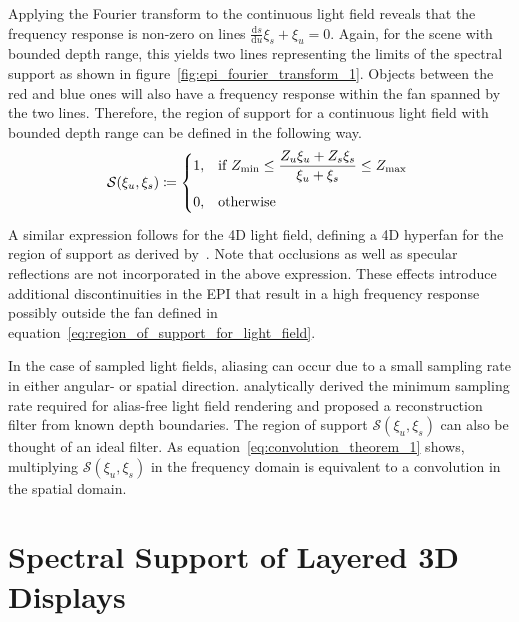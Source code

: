 Applying the Fourier transform to the continuous light field reveals that the frequency response is non-zero on lines $\frac{\textrm{d}s}{\textrm{d}u} \xi_s + \xi_u = 0$. 
Again, for the scene with bounded depth range, this yields two lines representing the limits of the spectral support as shown in figure~\ref{fig:epi_fourier_transform_1}.
Objects between the red and blue ones will also have a frequency response within the fan spanned by the two lines.
Therefore, the region of support for a continuous light field with bounded depth range can be defined in the following way.
\begin{equation}\label{eq:region_of_support_for_light_field}
	\mathcal{S}(\xi_u, \xi_s) \coloneqq 
	    \begin{dcases*}
		    1, 			& if $Z_\text{min} \leq \dfrac{Z_u \xi_u + Z_s \xi_s}{\xi_u + \xi_s} \leq Z_\text{max}$ \\
		    0,			& otherwise $\vphantom{\dfrac{0}{0}}$ 
	    \end{dcases*}
\end{equation}
A similar expression follows for the 4D light field, defining a 4D hyperfan for the region of support as derived by~\cite{LinearVolumetricFocus}.
Note that occlusions as well as specular reflections are not incorporated in the above expression.
These effects introduce additional discontinuities in the EPI that result in a high frequency response possibly outside the fan defined in equation~\ref{eq:region_of_support_for_light_field}.

In the case of sampled light fields, aliasing can occur due to a small sampling rate in either angular- or spatial direction.
\cite{PlenopticSampling} analytically derived the minimum sampling rate required for alias-free light field rendering and proposed a reconstruction filter from known depth boundaries.
The region of support $\mathcal{S}(\xi_u, \xi_s)$ can also be thought of an ideal filter.
As equation~\ref{eq:convolution_theorem_1} shows, multiplying $\mathcal{S}(\xi_u, \xi_s)$ in the frequency domain is equivalent to a convolution in the spatial domain.

\section{Spectral Support of Layered 3D Displays}
\label{sec:Spectral_Support_for_Display}

